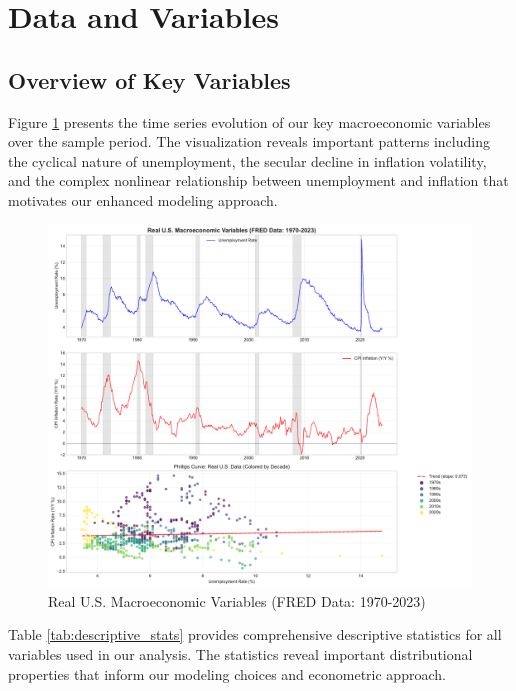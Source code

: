 \documentclass[12pt]{article}
\begin{document}
\section{Data and Variables}

\subsection{Overview of Key Variables}

Figure \ref{fig:time_series} presents the time series evolution of our key macroeconomic variables over the sample period. The visualization reveals important patterns including the cyclical nature of unemployment, the secular decline in inflation volatility, and the complex nonlinear relationship between unemployment and inflation that motivates our enhanced modeling approach.

\begin{figure}[H]
\centering
\includegraphics[width=\textwidth]{figures/time_series_overview.pdf}
\caption{Real U.S. Macroeconomic Variables (FRED Data: 1970-2023)}
\label{fig:time_series}
\end{figure}

Table \ref{tab:descriptive_stats} provides comprehensive descriptive statistics for all variables used in our analysis. The statistics reveal important distributional properties that inform our modeling choices and econometric approach.


\end{document}
